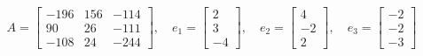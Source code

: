 \documentclass[11pt]{report}
\begin{document}
$$A = \left[\begin{matrix}-196 & 156 & -114\\90 & 26 & -111\\-108 & 24 & -244\end{matrix}\right],\quad e_1 = \left[\begin{matrix}2\\3\\-4\end{matrix}\right],\quad e_2 = \left[\begin{matrix}4\\-2\\2\end{matrix}\right],\quad e_3 = \left[\begin{matrix}-2\\-2\\-3\end{matrix}\right]$$
\end{document}
